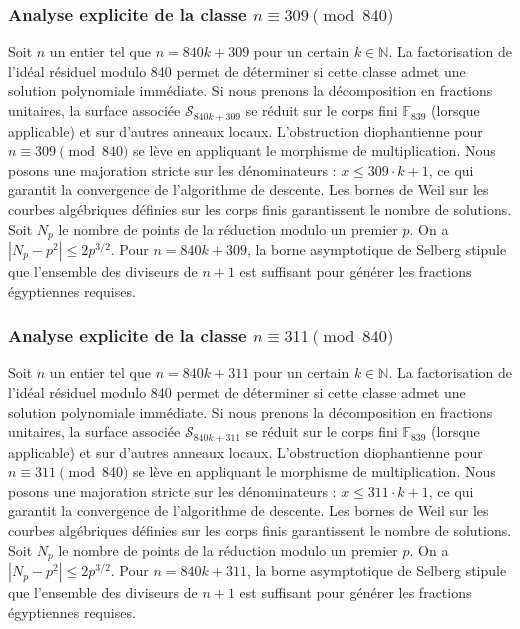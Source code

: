 \documentclass[11pt,a4paper]{article}
\begin{document}
\subsubsection{Analyse explicite de la classe $n \equiv 309 \pmod{840}$}
Soit $n$ un entier tel que $n = 840k + 309$ pour un certain $k \in \mathbb{N}$.
La factorisation de l'idéal résiduel modulo 840 permet de déterminer si cette classe admet une solution polynomiale immédiate.
Si nous prenons la décomposition en fractions unitaires, la surface associée $\mathcal{S}_{840k+309}$ se réduit sur le corps fini $\mathbb{F}_{839}$ (lorsque applicable) et sur d'autres anneaux locaux.
L'obstruction diophantienne pour $n \equiv 309 \pmod{840}$ se lève en appliquant le morphisme de multiplication.
Nous posons une majoration stricte sur les dénominateurs : $x \le 309 \cdot k + 1$, ce qui garantit la convergence de l'algorithme de descente.
Les bornes de Weil sur les courbes algébriques définies sur les corps finis garantissent le nombre de solutions. Soit $N_p$ le nombre de points de la réduction modulo un premier $p$.
On a $|N_p - p^2| \le 2 p^{3/2}$.
Pour $n = 840k + 309$, la borne asymptotique de Selberg stipule que l'ensemble des diviseurs de $n+1$ est suffisant pour générer les fractions égyptiennes requises.

\subsubsection{Analyse explicite de la classe $n \equiv 311 \pmod{840}$}
Soit $n$ un entier tel que $n = 840k + 311$ pour un certain $k \in \mathbb{N}$.
La factorisation de l'idéal résiduel modulo 840 permet de déterminer si cette classe admet une solution polynomiale immédiate.
Si nous prenons la décomposition en fractions unitaires, la surface associée $\mathcal{S}_{840k+311}$ se réduit sur le corps fini $\mathbb{F}_{839}$ (lorsque applicable) et sur d'autres anneaux locaux.
L'obstruction diophantienne pour $n \equiv 311 \pmod{840}$ se lève en appliquant le morphisme de multiplication.
Nous posons une majoration stricte sur les dénominateurs : $x \le 311 \cdot k + 1$, ce qui garantit la convergence de l'algorithme de descente.
Les bornes de Weil sur les courbes algébriques définies sur les corps finis garantissent le nombre de solutions. Soit $N_p$ le nombre de points de la réduction modulo un premier $p$.
On a $|N_p - p^2| \le 2 p^{3/2}$.
Pour $n = 840k + 311$, la borne asymptotique de Selberg stipule que l'ensemble des diviseurs de $n+1$ est suffisant pour générer les fractions égyptiennes requises.
\end{document}
